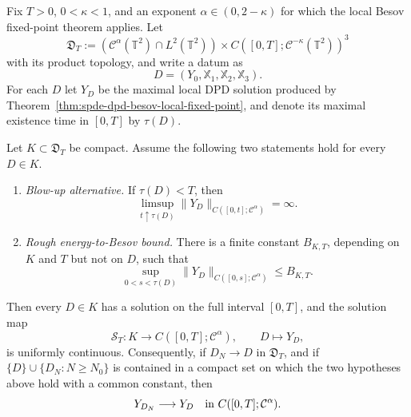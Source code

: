 \begin{lemma}
\label{lem:spde-dpd-global-compact-continuity-criterion}
Fix \(T>0\), \(0<\kappa<1\), and an exponent
\(\alpha\in(0,2-\kappa)\) for which the local Besov fixed-point theorem
applies.  Let
\[
  \mathfrak D_T
  :=(\mathcal C^\alpha(\mathbb T^2)\cap L^2(\mathbb T^2))
    \times C([0,T];\mathcal C^{-\kappa}(\mathbb T^2))^3
\]
with its product topology, and write a datum as
\[
  D=(Y_0,\mathbb X_1,\mathbb X_2,\mathbb X_3).
\]
For each \(D\) let \(Y_D\) be the maximal local DPD solution produced by
Theorem~\ref{thm:spde-dpd-besov-local-fixed-point}, and denote its maximal
existence time in \([0,T]\) by \(\tau(D)\).

Let \(K\subset\mathfrak D_T\) be compact.  Assume the following two
statements hold for every \(D\in K\).
\begin{enumerate}
\item \emph{Blow-up alternative.}  If \(\tau(D)<T\), then
\[
  \limsup_{t\uparrow\tau(D)}
  \|Y_D\|_{C([0,t];\mathcal C^\alpha)}=\infty .
\]
\item \emph{Rough energy-to-Besov bound.}  There is a finite constant
\(B_{K,T}\), depending on \(K\) and \(T\) but not on \(D\), such that
\[
  \sup_{0<s<\tau(D)}
  \|Y_D\|_{C([0,s];\mathcal C^\alpha)}
  \leq B_{K,T}.
\]
\end{enumerate}
Then every \(D\in K\) has a solution on the full interval \([0,T]\), and
the solution map
\[
  \mathcal S_T:K\longrightarrow C([0,T];\mathcal C^\alpha),
  \qquad D\longmapsto Y_D,
\]
is uniformly continuous.  Consequently, if \(D_N\to D\) in
\(\mathfrak D_T\), and if \(\{D\}\cup\{D_N:N\geq N_0\}\) is contained in a
compact set on which the two hypotheses above hold with a common constant,
then
\[
  Y_{D_N}\longrightarrow Y_D
  \quad\hbox{in }C([0,T];\mathcal C^\alpha).
\]
\end{lemma}

